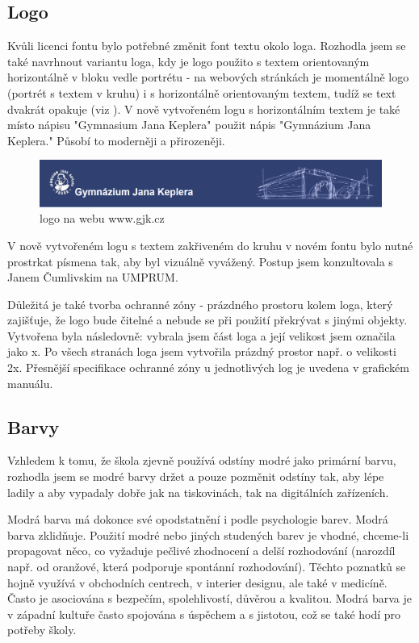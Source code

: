 \documentclass[11pt,a4paper,twoside,openright]{report}
\begin{document}
\subsection{Logo}
Kvůli licenci fontu bylo potřebné změnit font textu okolo loga.
Rozhodla jsem se také navrhnout variantu loga, kdy je logo použito s textem orientovaným horizontálně v bloku vedle portrétu - na webových stránkách je momentálně logo (portrét s textem v kruhu) i s horizontálně orientovaným textem, tudíž se text dvakrát opakuje (viz ). V nově vytvořeném logu s horizontálním textem je také místo nápisu "Gymnasium Jana Keplera" použit nápis "Gymnázium Jana Keplera." Působí to moderněji a přirozeněji.

\begin{figure}[htbp]
  \includegraphics[width=1\textwidth]{img/gjk_web_hlavicka.png}
  \caption{logo na webu www.gjk.cz}
  \label{fig:logo_web}
\end{figure}


V nově vytvořeném logu s textem zakřiveném do kruhu v novém fontu bylo nutné prostrkat písmena tak, aby byl vizuálně vyvážený. Postup jsem konzultovala s Janem Čumlivskim na UMPRUM.

Důležitá je také tvorba ochranné zóny - prázdného prostoru kolem loga, který zajišťuje, že logo bude čitelné a nebude se při použití překrývat s jinými objekty. Vytvořena byla následovně: vybrala jsem část loga a její velikost jsem označila jako x. Po všech stranách loga jsem vytvořila prázdný prostor např. o velikosti 2x. Přesnější specifikace ochranné zóny u jednotlivých log je uvedena v grafickém manuálu.

\subsection{Barvy}
Vzhledem k tomu, že škola zjevně používá odstíny modré jako primární barvu, rozhodla jsem se modré barvy držet a pouze pozměnit odstíny tak, aby lépe ladily a aby vypadaly dobře jak na tiskovinách, tak na digitálních zařízeních.

Modrá barva má dokonce své opodstatnění i podle psychologie barev. Modrá barva zklidňuje. Použití modré nebo jiných studených barev je vhodné, chceme-li propagovat něco, co vyžaduje pečlivé zhodnocení a delší rozhodování (narozdíl např. od oranžové, která podporuje spontánní rozhodování). Těchto poznatků se hojně využívá v obchodních centrech, v interier designu, ale také v medicíně.
\cite{enwiki:1144176285}
Často je asociována s bezpečím, spolehlivostí, důvěrou a kvalitou.\cite{hallock}
Modrá barva je v západní kultuře často spojována s úspěchem a s jistotou, což se také hodí pro potřeby školy. \cite{grafika}
\end{document}
